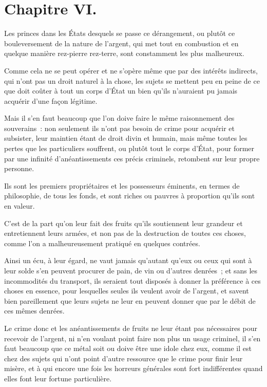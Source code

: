 \documentclass[french,twoside]{book} %
\begin{document}
\section[{Chapitre VI.}]{Chapitre VI.}
\noindent Les princes dans les États desquels se passe ce dérangement, ou plutôt ce bouleversement de la nature de l’argent, qui met tout en combustion et en quelque manière rez-pierre rez-terre, sont constamment les plus malheureux.\par
Comme cela ne se peut opérer et ne s’opère même que par des intérêts indirects, qui n’ont pas un droit naturel à la chose, les sujets se mettent peu en peine de ce que doit coûter à tout un corps d’État un bien qu’ils n’auraient pu jamais acquérir d’une façon légitime.\par
Mais il s’en faut beaucoup que l’on doive faire le même raisonnement des souverains : non seulement ils n’ont pas besoin de crime pour acquérir et subsister, leur maintien étant de droit divin et humain, mais même toutes les pertes que les particuliers souffrent, ou plutôt tout le corps d’État, pour former par une infinité d’anéantissements ces précis criminels, retombent sur leur propre personne.\par
Ils sont les premiers propriétaires et les possesseurs éminents, en termes de philosophie, de tous les fonds, et sont riches ou pauvres à proportion qu’ils sont en valeur.\par
C’est de la part qu’on leur fait des fruits qu’ils soutiennent leur grandeur et entretiennent leurs armées, et non pas de la destruction de toutes ces choses, comme l’on a malheureusement pratiqué en quelques contrées.\par
Ainsi un écu, à leur égard, ne vaut jamais qu’autant qu’eux ou ceux qui sont à leur solde s’en peuvent procurer de pain, de vin ou d’autres denrées ; et sans les incommodités du transport, ils seraient tout disposés à donner la préférence à ces choses en essence, pour lesquelles seules ils veulent avoir de l’argent, et savent bien pareillement que leurs sujets ne leur en peuvent donner que par le débit de ces mêmes denrées.\par
Le crime donc et les anéantissements de fruits ne leur étant pas nécessaires pour recevoir de l’argent, ni n’en voulant point faire non plus un usage criminel, il s’en faut beaucoup que ce métal soit ou doive être une idole chez eux, comme il est chez des sujets qui n’ont point d’autre ressource que le crime pour finir leur misère, et à qui encore une fois les horreurs générales sont fort indifférentes quand elles font leur fortune particulière.\par
\end{document}
